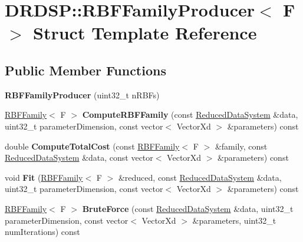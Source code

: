 \hypertarget{struct_d_r_d_s_p_1_1_r_b_f_family_producer}{\section{D\-R\-D\-S\-P\-:\-:R\-B\-F\-Family\-Producer$<$ F $>$ Struct Template Reference}
\label{struct_d_r_d_s_p_1_1_r_b_f_family_producer}
}
\subsection*{Public Member Functions}
\begin{DoxyCompactItemize}
\item 
\hypertarget{struct_d_r_d_s_p_1_1_r_b_f_family_producer_a0282e37f5ef5428167e10724710c20e7}{{\bfseries R\-B\-F\-Family\-Producer} (uint32\-\_\-t n\-R\-B\-Fs)}\label{struct_d_r_d_s_p_1_1_r_b_f_family_producer_a0282e37f5ef5428167e10724710c20e7}

\item 
\hypertarget{struct_d_r_d_s_p_1_1_r_b_f_family_producer_a2e3950bcb42af71ce2911188f048e969}{\hyperlink{struct_d_r_d_s_p_1_1_r_b_f_family}{R\-B\-F\-Family}$<$ F $>$ {\bfseries Compute\-R\-B\-F\-Family} (const \hyperlink{struct_d_r_d_s_p_1_1_reduced_data_system}{Reduced\-Data\-System} \&data, uint32\-\_\-t parameter\-Dimension, const vector$<$ Vector\-Xd $>$ \&parameters) const }\label{struct_d_r_d_s_p_1_1_r_b_f_family_producer_a2e3950bcb42af71ce2911188f048e969}

\item 
\hypertarget{struct_d_r_d_s_p_1_1_r_b_f_family_producer_a6bf81ec016b1927ffc69522622de07f5}{double {\bfseries Compute\-Total\-Cost} (const \hyperlink{struct_d_r_d_s_p_1_1_r_b_f_family}{R\-B\-F\-Family}$<$ F $>$ \&family, const \hyperlink{struct_d_r_d_s_p_1_1_reduced_data_system}{Reduced\-Data\-System} \&data, const vector$<$ Vector\-Xd $>$ \&parameters) const }\label{struct_d_r_d_s_p_1_1_r_b_f_family_producer_a6bf81ec016b1927ffc69522622de07f5}

\item 
\hypertarget{struct_d_r_d_s_p_1_1_r_b_f_family_producer_a0aa34f75bbd4cf0345c7b3556ac11058}{void {\bfseries Fit} (\hyperlink{struct_d_r_d_s_p_1_1_r_b_f_family}{R\-B\-F\-Family}$<$ F $>$ \&reduced, const \hyperlink{struct_d_r_d_s_p_1_1_reduced_data_system}{Reduced\-Data\-System} \&data, uint32\-\_\-t parameter\-Dimension, const vector$<$ Vector\-Xd $>$ \&parameters) const }\label{struct_d_r_d_s_p_1_1_r_b_f_family_producer_a0aa34f75bbd4cf0345c7b3556ac11058}

\item 
\hypertarget{struct_d_r_d_s_p_1_1_r_b_f_family_producer_a288ad4de46e43c3b1c5338b34c81ba6a}{\hyperlink{struct_d_r_d_s_p_1_1_r_b_f_family}{R\-B\-F\-Family}$<$ F $>$ {\bfseries Brute\-Force} (const \hyperlink{struct_d_r_d_s_p_1_1_reduced_data_system}{Reduced\-Data\-System} \&data, uint32\-\_\-t parameter\-Dimension, const vector$<$ Vector\-Xd $>$ \&parameters, uint32\-\_\-t num\-Iterations) const }\label{struct_d_r_d_s_p_1_1_r_b_f_family_producer_a288ad4de46e43c3b1c5338b34c81ba6a}

\end{DoxyCompactItemize}
